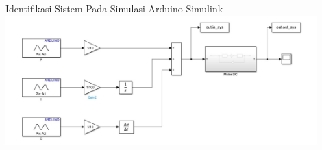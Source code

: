 \documentclass[10pt,xcolor={dvipsnames}]{beamer}
\begin{document}


\begin{frame}{Identifikasi Sistem Pada Simulasi Arduino-Simulink}
	\centering
	\includegraphics[width=12cm]{Hasil Matlab/blokdiagramident.jpg}
\end{frame}
\end{document}
